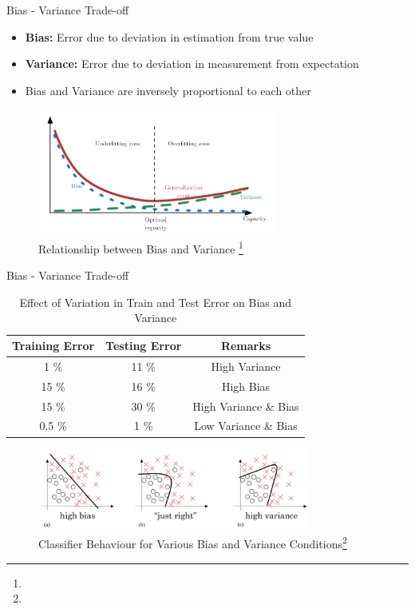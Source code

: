 \documentclass[10pt]{beamer}
\begin{document}
\begin{frame}{Bias - Variance Trade-off}
   \begin{itemize}
       \item \textbf{Bias:} Error due to deviation in estimation from true value
       \item \textbf{Variance:} Error due to deviation in measurement from expectation
       \item Bias and Variance are inversely proportional to each other 
   \end{itemize}
   
   \begin{figure}
        \centering
        \includegraphics[width=0.7\textwidth]{Images/relationship.png}
        \caption{Relationship between Bias and Variance \footnote{}}
    \end{figure}
    
\end{frame}

\begin{frame}{Bias - Variance Trade-off}
\begin{table}
    \centering
    \begin{tabular}{|c|c|c|}
        \hline
        Training Error & Testing Error & Remarks \\
        \hline
        1 \% & 11 \% & High Variance \\
        \hline
        15 \% & 16 \% & High Bias \\
        \hline
        15 \% & 30 \% & High Variance \& Bias \\
        \hline
        0.5 \% & 1 \% & Low Variance \& Bias \\
        \hline        
    \end{tabular}
    \caption{Effect of Variation in Train and Test Error on Bias and Variance}
\end{table}

\begin{figure}
     \centering
     \includegraphics[width=0.8\textwidth]{Images/tradeoff.png}
     \caption{Classifier Behaviour for Various Bias and Variance Conditions\footnote{}}
\end{figure}
\end{frame}
\end{document}
